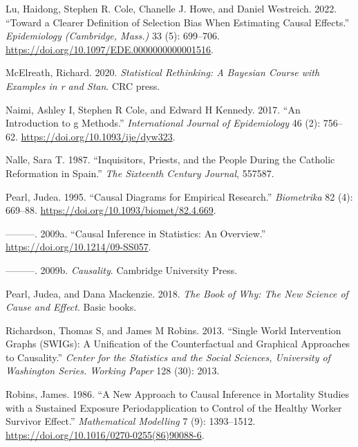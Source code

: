 \documentclass[
  singlecolumn]{report}
\newlength{\cslhangindent}
\newlength{\cslentryspacingunit} %
\newenvironment{CSLReferences}[2] %
 {%
  \setlength{\parindent}{0pt}
  \ifodd #1
  \let\oldpar\par
  \def\par{\hangindent=\cslhangindent\oldpar}
  \fi
  \setlength{\parskip}{#2\cslentryspacingunit}
 }%
 {}
\begin{document}
\begin{CSLReferences}{1}{0}
\leavevmode{}%
Lu, Haidong, Stephen R. Cole, Chanelle J. Howe, and Daniel Westreich.
2022. {``Toward a Clearer Definition of Selection Bias When Estimating
Causal Effects.''} \emph{Epidemiology (Cambridge, Mass.)} 33 (5):
699--706. \url{https://doi.org/10.1097/EDE.0000000000001516}.

\leavevmode{}%
McElreath, Richard. 2020. \emph{Statistical Rethinking: A Bayesian
Course with Examples in r and Stan}. CRC press.

\leavevmode{}%
Naimi, Ashley I, Stephen R Cole, and Edward H Kennedy. 2017. {``An
Introduction to g Methods.''} \emph{International Journal of
Epidemiology} 46 (2): 756--62. \url{https://doi.org/10.1093/ije/dyw323}.

\leavevmode{}%
Nalle, Sara T. 1987. {``Inquisitors, Priests, and the People During the
Catholic Reformation in Spain.''} \emph{The Sixteenth Century Journal},
557587.

\leavevmode{}%
Pearl, Judea. 1995. {``Causal Diagrams for Empirical Research.''}
\emph{Biometrika} 82 (4): 669--88.
\url{https://doi.org/10.1093/biomet/82.4.669}.

\leavevmode{}%
---------. 2009a. {``Causal Inference in Statistics: An Overview.''}
\url{https://doi.org/10.1214/09-SS057}.

\leavevmode{}%
---------. 2009b. \emph{Causality}. Cambridge University Press.

\leavevmode{}%
Pearl, Judea, and Dana Mackenzie. 2018. \emph{The Book of Why: The New
Science of Cause and Effect}. Basic books.

\leavevmode{}%
Richardson, Thomas S, and James M Robins. 2013. {``Single World
Intervention Graphs (SWIGs): A Unification of the Counterfactual and
Graphical Approaches to Causality.''} \emph{Center for the Statistics
and the Social Sciences, University of Washington Series. Working Paper}
128 (30): 2013.

\leavevmode{}%
Robins, James. 1986. {``A New Approach to Causal Inference in Mortality
Studies with a Sustained Exposure Period{\textemdash}application to
Control of the Healthy Worker Survivor Effect.''} \emph{Mathematical
Modelling} 7 (9): 1393--1512.
\url{https://doi.org/10.1016/0270-0255(86)90088-6}.


\end{CSLReferences}
\end{document}
